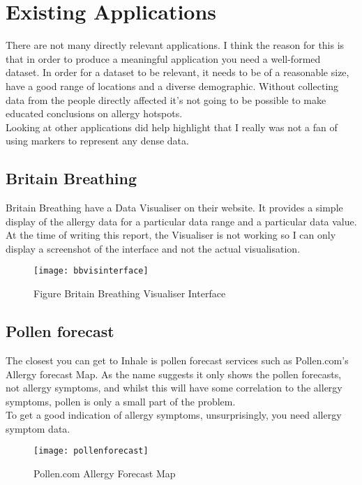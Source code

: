 \section{Existing Applications}
\label{sec:diagrams}

There are not many directly relevant applications. I think the reason for this is that in order to produce a meaningful application you need a well-formed dataset. In order for a dataset to be relevant, it needs to be of a reasonable size, have a good range of locations and a diverse demographic. Without collecting data from the people directly affected it's not going to be possible to make educated conclusions on allergy hotspots.\\

Looking at other applications did help highlight that I really was not a fan of using markers to represent any dense data.



\subsection{Britain Breathing}
Britain Breathing have a Data Visualiser on their website. It provides a simple display of the allergy data for a particular data range and a particular data value. At the time of writing this report, the Visualiser is not working so I can only display a screenshot of the interface and not the actual visualisation.

\begin{figure}[H]
\begin{center}
\texttt{[image: bbvisinterface]}
\caption{Figure Britain Breathing Visualiser Interface}
\end{center}
\end{figure}

\subsection{Pollen forecast}

The closest you can get to Inhale is pollen forecast services such as Pollen.com's Allergy forecast Map. As the name suggests it only shows the pollen forecasts, not allergy symptoms, and whilst this will have some correlation to the allergy symptoms, pollen is only a small part of the problem.\\

To get a good indication of allergy symptoms, unsurprisingly, you need allergy symptom data.\\

\begin{figure}[H]
\begin{center}
\texttt{[image: pollenforecast]}
\caption{Pollen.com Allergy Forecast Map}
\end{center}
\end{figure}